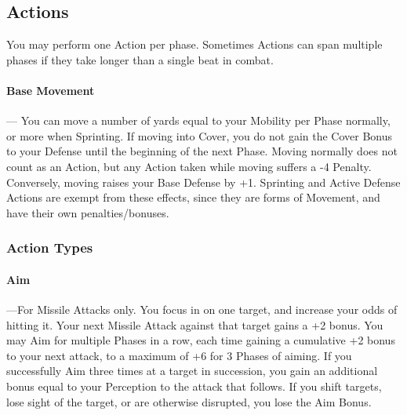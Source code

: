 \documentclass[oneside,11pt,english]{book}
\begin{document}
\subsection{Actions}\label{sec:combat-actions}
You may perform one Action per phase. Sometimes Actions can span multiple phases if they take longer
than a single beat in combat.

\paragraph{Base Movement}---\quad 
You can move a number of yards equal to your Mobility per Phase normally, or more
when Sprinting. If moving into Cover, you do not gain the Cover Bonus to your Defense until the
beginning of the next Phase.
Moving normally does not count as an Action, but any Action taken while moving suffers a -4 Penalty.
Conversely, moving raises your Base Defense by +1. Sprinting and Active Defense Actions are exempt
from these effects, since they are forms of Movement, and have their own penalties/bonuses.
\subsubsection{Action Types}
\paragraph{Aim}---\quad For Missile Attacks only. You focus in on one target, and increase your odds of hitting it. Your next
Missile Attack against that target gains a +2 bonus. You may Aim for multiple Phases in a row, each time
gaining a cumulative +2 bonus to your next attack, to a maximum of +6 for 3 Phases of aiming. If you
successfully Aim three times at a target in succession, you gain an additional bonus equal to your
Perception to the attack that follows. If you shift targets, lose sight of the target, or are otherwise
disrupted, you lose the Aim Bonus.
\end{document}
